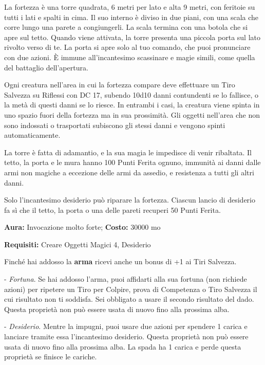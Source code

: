 \begin{multicols}{2}
La fortezza è una torre quadrata, 6 metri per lato e alta 9 metri, con feritoie su tutti i lati e spalti in cima. Il suo interno è diviso in due piani, con una scala che corre lungo una parete a congiungerli. La scala termina con una botola che si apre sul tetto. Quando viene attivata, la torre presenta una piccola porta sul lato rivolto verso di te. La porta si apre solo al tuo comando, che puoi pronunciare con due azioni. È immune all'incantesimo scassinare e magie simili, come quella del battaglio dell'apertura.

Ogni creatura nell'area in cui la fortezza compare deve effettuare un Tiro Salvezza su Riflessi con DC 17, subendo 10d10 danni contundenti se lo fallisce, o la metà di questi danni se lo riesce. In entrambi i casi, la creatura viene spinta in uno spazio fuori della fortezza ma in sua prossimità. Gli oggetti nell'area che non sono indossati o trasportati subiscono gli stessi danni e vengono spinti automaticamente.

La torre è fatta di adamantio, e la sua magia le impedisce di venir ribaltata. Il tetto, la porta e le mura hanno 100 Punti Ferita ognuno, immunità ai danni dalle armi non magiche a eccezione delle armi da assedio, e resistenza a tutti gli altri danni.

Solo l'incantesimo desiderio può riparare la fortezza. Ciascun lancio di desiderio fa sì che il tetto, la porta o una delle pareti recuperi 50 Punti Ferita.


\textbf{Aura:} Invocazione molto forte; \textbf{Costo:} 30000 mo

\textbf{Requisiti:} Creare Oggetti Magici 4, Desiderio

Finché hai addosso la \textbf{arma} ricevi anche un bonus di +1 ai Tiri Salvezza.

- \emph{Fortuna}. Se hai addosso l'arma, puoi affidarti alla sua fortuna (non richiede azioni) per ripetere un Tiro per Colpire, prova di Competenza o Tiro Salvezza il cui risultato non ti soddisfa. Sei obbligato a usare il secondo risultato del dado. Questa proprietà non può essere usata di nuovo fino alla prossima alba.

- \emph{Desiderio}. Mentre la impugni, puoi usare due azioni per spendere 1 carica e lanciare tramite essa l'incantesimo desiderio. Questa proprietà non può essere usata di nuovo fino alla prossima alba. La spada ha 1 carica e perde questa proprietà se finisce le cariche.



\end{multicols}
